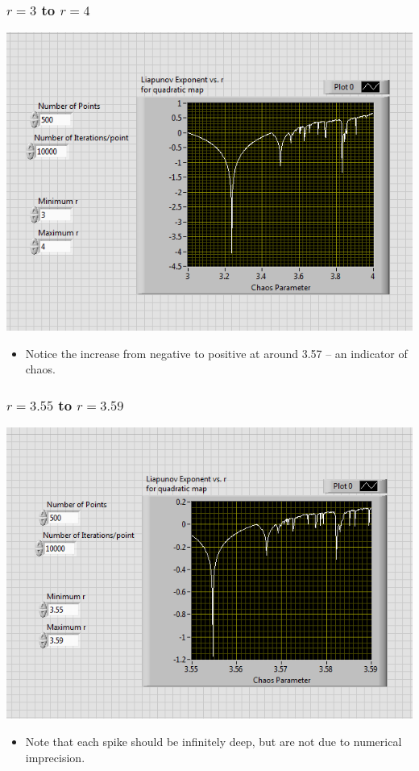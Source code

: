 \documentclass[9pt]{beamer}
\begin{document}
\begin{frame}
	\frametitle{\( r = 3 \) to \( r = 4 \)}

	\begin{center}
		\includegraphics[scale=0.5]{images/liapunov_3_4.PNG}
	\end{center}
	\begin{itemize}
		\item Notice the increase from negative to positive at around 3.57 -- an
			indicator of chaos.   
	\end{itemize}
\end{frame}

\begin{frame}
	\frametitle{\( r = 3.55 \) to \( r = 3.59 \)}

	\begin{center}
		\includegraphics[scale=0.5]{images/liapunov_3.55_3.59}
	\end{center}
	\begin{itemize}
		\item Note that each spike should be
			infinitely deep, but are not due to numerical imprecision.  
	\end{itemize}
\end{frame}
\end{document}
